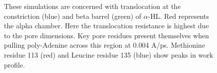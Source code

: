 \documentclass[a4paper,10pt]{article}
\begin{document}
\begin{figure}
    \hspace{1.5in}
\caption{These simulations are concerned with translocation at the constriction (blue) and beta barrel 
(green) of $\alpha$-HL. Red represents the alpha chamber.
Here the translocation resistance is highest due to the pore dimensions.
Key pore residues present themselves when pulling poly-Adenine across this region at 0.004 A/ps. 
Methionine residue 113 (red) and Leucine residue 135 (blue) show peaks in work profile.}
 \label{model}
\end{figure}
\end{document}
